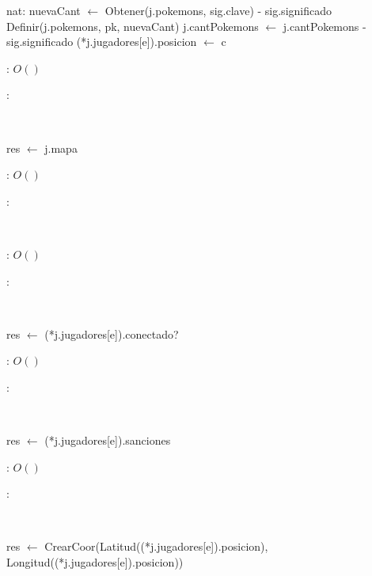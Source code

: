 \begin{Algoritmos}
\begin{algorithm}[H]
{{				nat: nuevaCant $\leftarrow$ Obtener(j.pokemons, sig.clave) - sig.significado\;
				Definir(j.pokemons, pk, nuevaCant)\;
				j.cantPokemons $\leftarrow$ j.cantPokemons - sig.significado\;
			}
		}{
			(*j.jugadores[e]).posicion $\leftarrow$ c\;
		}
	\end{algorithm}

	\complejidad: $O()$

	\justifcomp:

	~

	\begin{algorithm}[H]
		\NoCaptionOfAlgo
		\caption{}
		res $\leftarrow$ j.mapa\;
	\end{algorithm}

	\complejidad: $O()$

	\justifcomp:

	~

	\begin{algorithm}[H]
		\NoCaptionOfAlgo
		\caption{}
	\end{algorithm}

	\complejidad: $O()$

	\justifcomp:

	~

	\begin{algorithm}[H]
		\NoCaptionOfAlgo
		\caption{}
		res $\leftarrow$ (*j.jugadores[e]).conectado?\;
	\end{algorithm}

	\complejidad: $O()$

	\justifcomp:

	~

	\begin{algorithm}[H]
		\NoCaptionOfAlgo
		\caption{}
		res $\leftarrow$ (*j.jugadores[e]).sanciones\;
	\end{algorithm}

	\complejidad: $O()$

	\justifcomp:

	~

	\begin{algorithm}[H]
		\NoCaptionOfAlgo
		\caption{}
		res $\leftarrow$ CrearCoor(Latitud((*j.jugadores[e]).posicion), Longitud((*j.jugadores[e]).posicion))\;
	\end{algorithm}


\end{Algoritmos}
